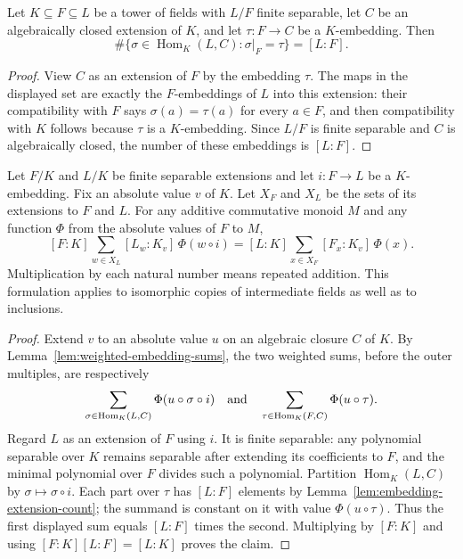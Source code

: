 \begin{lemma}
\label{lem:embedding-extension-count}
\leanok
{}
Let $K\subseteq F\subseteq L$ be a tower of fields with $L/F$ finite
separable, let $C$ be an algebraically closed extension of $K$, and
let $\tau:F\to C$ be a $K$-embedding. Then
\[
 \#\{\sigma\in\operatorname{Hom}_K(L,C):\sigma|_F=\tau\}=[L:F].
\]
\end{lemma}
\begin{proof}
View $C$ as an extension of $F$ by the embedding $\tau$.
The maps in the displayed set are exactly the $F$-embeddings of $L$
into this extension: their compatibility with $F$ says
$\sigma(a)=\tau(a)$ for every $a\in F$, and then compatibility with
$K$ follows because $\tau$ is a $K$-embedding.
Since $L/F$ is finite separable and $C$ is algebraically closed,
the number of these embeddings is $[L:F]$.
\end{proof}

\begin{lemma}
\label{lem:weighted-embedding-pullback}
\leanok
{}
Let $F/K$ and $L/K$ be finite separable extensions and let
$i:F\to L$ be a $K$-embedding. Fix an absolute value $v$ of $K$.
Let $X_F$ and $X_L$ be the sets of its extensions to $F$ and $L$.
For any additive commutative monoid $M$ and any function $\Phi$
from the absolute values of $F$ to $M$,
\[
 [F:K]\sum_{w\in X_L}[L_w:K_v]\,\Phi(w\circ i)
 =[L:K]\sum_{x\in X_F}[F_x:K_v]\,\Phi(x).
\]
Multiplication by each natural number means repeated addition.
This formulation applies to isomorphic copies of intermediate
fields as well as to inclusions.
\end{lemma}
\begin{proof}
Extend $v$ to an absolute value $u$ on an algebraic closure $C$ of
$K$. By Lemma~\ref{lem:weighted-embedding-sums}, the two weighted
sums, before the outer multiples, are respectively
\[
 \sum_{\sigma\in\operatorname{Hom}_K(L,C)}
       \Phi(u\circ\sigma\circ i)
 \quad\hbox{and}\quad
 \sum_{\tau\in\operatorname{Hom}_K(F,C)}\Phi(u\circ\tau).
\]
Regard $L$ as an extension of $F$ using $i$.
It is finite separable: any polynomial separable over $K$ remains
separable after extending its coefficients to $F$, and the minimal
polynomial over $F$ divides such a polynomial.
Partition $\operatorname{Hom}_K(L,C)$ by $\sigma\mapsto\sigma\circ i$.
Each part over $\tau$ has $[L:F]$ elements by
Lemma~\ref{lem:embedding-extension-count}; the summand is constant
on it with value $\Phi(u\circ\tau)$.
Thus the first displayed sum equals $[L:F]$ times the second.
Multiplying by $[F:K]$ and using $[F:K][L:F]=[L:K]$ proves the claim.
\end{proof}

